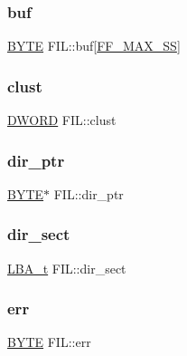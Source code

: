 \subsubsection{\texorpdfstring{buf}{buf}}
{\footnotesize\ttfamily \mbox{\hyperlink{ff_8h_a4ae1dab0fb4b072a66584546209e7d58}{B\+Y\+TE}} F\+I\+L\+::buf\mbox{[}\mbox{\hyperlink{ffconf_8h_a104c36ee46f9d6e76dadf37f3d9696cc}{F\+F\+\_\+\+M\+A\+X\+\_\+\+SS}}\mbox{]}}

\mbox{\label{struct_f_i_l_aa41312aba551b9a6d1c9d3c8c7d2734b}} 
\subsubsection{\texorpdfstring{clust}{clust}}
{\footnotesize\ttfamily \mbox{\hyperlink{ff_8h_ad342ac907eb044443153a22f964bf0af}{D\+W\+O\+RD}} F\+I\+L\+::clust}

\mbox{\label{struct_f_i_l_a5af9e9fb312b629220eaf684dd28c4a9}} 
\subsubsection{\texorpdfstring{dir\_ptr}{dir\_ptr}}
{\footnotesize\ttfamily \mbox{\hyperlink{ff_8h_a4ae1dab0fb4b072a66584546209e7d58}{B\+Y\+TE}}$\ast$ F\+I\+L\+::dir\+\_\+ptr}

\mbox{\label{struct_f_i_l_a19e61b116df8e6f2138243998e43f131}} 
\subsubsection{\texorpdfstring{dir\_sect}{dir\_sect}}
{\footnotesize\ttfamily \mbox{\hyperlink{ff_8h_a1f3c30a83148a28340f009d4e583f087}{L\+B\+A\+\_\+t}} F\+I\+L\+::dir\+\_\+sect}

\mbox{\label{struct_f_i_l_aea440945db26de9c4a88065c0c887fda}} 
\subsubsection{\texorpdfstring{err}{err}}
{\footnotesize\ttfamily \mbox{\hyperlink{ff_8h_a4ae1dab0fb4b072a66584546209e7d58}{B\+Y\+TE}} F\+I\+L\+::err}

